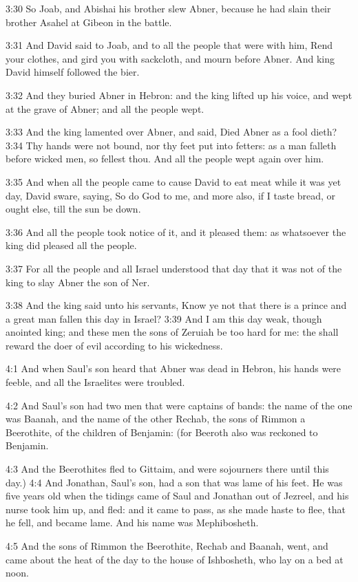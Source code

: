 3:30 So Joab, and Abishai his brother slew Abner, because he had slain
their brother Asahel at Gibeon in the battle.

3:31 And David said to Joab, and to all the people that were with him,
Rend your clothes, and gird you with sackcloth, and mourn before
Abner. And king David himself followed the bier.

3:32 And they buried Abner in Hebron: and the king lifted up his
voice, and wept at the grave of Abner; and all the people wept.

3:33 And the king lamented over Abner, and said, Died Abner as a fool
dieth?  3:34 Thy hands were not bound, nor thy feet put into fetters:
as a man falleth before wicked men, so fellest thou. And all the
people wept again over him.

3:35 And when all the people came to cause David to eat meat while it
was yet day, David sware, saying, So do God to me, and more also, if I
taste bread, or ought else, till the sun be down.

3:36 And all the people took notice of it, and it pleased them: as
whatsoever the king did pleased all the people.

3:37 For all the people and all Israel understood that day that it was
not of the king to slay Abner the son of Ner.

3:38 And the king said unto his servants, Know ye not that there is a
prince and a great man fallen this day in Israel?  3:39 And I am this
day weak, though anointed king; and these men the sons of Zeruiah be
too hard for me: the \LORD shall reward the doer of evil according to
his wickedness.

4:1 And when Saul's son heard that Abner was dead in Hebron, his hands
were feeble, and all the Israelites were troubled.

4:2 And Saul's son had two men that were captains of bands: the name
of the one was Baanah, and the name of the other Rechab, the sons of
Rimmon a Beerothite, of the children of Benjamin: (for Beeroth also
was reckoned to Benjamin.

4:3 And the Beerothites fled to Gittaim, and were sojourners there
until this day.)  4:4 And Jonathan, Saul's son, had a son that was
lame of his feet. He was five years old when the tidings came of Saul
and Jonathan out of Jezreel, and his nurse took him up, and fled: and
it came to pass, as she made haste to flee, that he fell, and became
lame. And his name was Mephibosheth.

4:5 And the sons of Rimmon the Beerothite, Rechab and Baanah, went,
and came about the heat of the day to the house of Ishbosheth, who lay
on a bed at noon.

